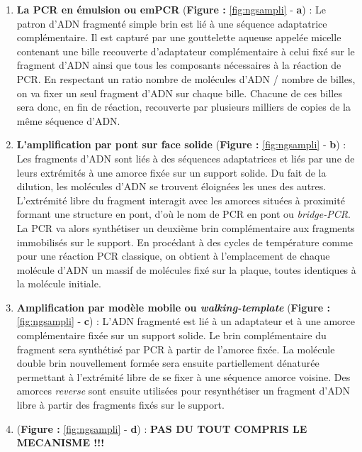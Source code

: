 \documentclass[12pt,twoside]{reedthesis}
\theoremstyle{definition}
\theoremstyle{definition}
\theoremstyle{remark}
\begin{document}
  \begin{enumerate}
  \def\labelenumi{\arabic{enumi}.}
  \item
    \textbf{La PCR en émulsion ou emPCR} (\textbf{Figure :
    }\ref{fig:ngsampli} - \textbf{a}) : Le patron d'ADN fragmenté simple
    brin est lié à une séquence adaptatrice complémentaire. Il est capturé
    par une gouttelette aqueuse appelée micelle contenant une bille
    recouverte d'adaptateur complémentaire à celui fixé sur le fragment
    d'ADN ainsi que tous les composants nécessaires à la réaction de PCR.
    En respectant un ratio nombre de molécules d'ADN / nombre de billes,
    on va fixer un seul fragment d'ADN sur chaque bille. Chacune de ces
    billes sera donc, en fin de réaction, recouverte par plusieurs
    milliers de copies de la même séquence d'ADN.
  \item
    \textbf{L'amplification par pont sur face solide} (\textbf{Figure :
    }\ref{fig:ngsampli} - \textbf{b}) : Les fragments d'ADN sont liés à
    des séquences adaptatrices et liés par une de leurs extrémités à une
    amorce fixée sur un support solide. Du fait de la dilution, les
    molécules d'ADN se trouvent éloignées les unes des autres. L'extrémité
    libre du fragment interagit avec les amorces situées à proximité
    formant une structure en pont, d'où le nom de PCR en pont ou
    \emph{bridge-PCR}. La PCR va alors synthétiser un deuxième brin
    complémentaire aux fragments immobilisés sur le support. En procédant
    à des cycles de température comme pour une réaction PCR classique, on
    obtient à l'emplacement de chaque molécule d'ADN un massif de
    molécules fixé sur la plaque, toutes identiques à la molécule
    initiale.
  \item
    \textbf{Amplification par modèle mobile ou \emph{walking-template}
    }(\textbf{Figure : }\ref{fig:ngsampli} - \textbf{c}) : L'ADN fragmenté
    est lié à un adaptateur et à une amorce complémentaire fixée sur un
    support solide. Le brin complémentaire du fragment sera synthétisé par
    PCR à partir de l'amorce fixée. La molécule double brin nouvellement
    formée sera ensuite partiellement dénaturée permettant à l'extrémité
    libre de se fixer à une séquence amorce voisine. Des amorces
    \emph{reverse} sont ensuite utilisées pour resynthétiser un fragment
    d'ADN libre à partir des fragments fixés sur le support.
  \item
    (\textbf{Figure : }\ref{fig:ngsampli} - \textbf{d}) : \textbf{PAS DU
    TOUT COMPRIS LE MECANISME !!! }
  \end{enumerate}
  
\end{document}
